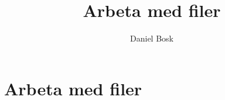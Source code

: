 \documentclass[a4paper,10pt,oneside,openright,
               oldfontcommands]{memoir}
\begin{document}
\title{%
  Arbeta med filer
}
\author{Daniel Bosk}

\maketitle

\begin{abstract}
  
\end{abstract}

\clearpage

\tableofcontents*

\chapter{Arbeta med filer}



\appendix


\printbibliography
\end{document}
